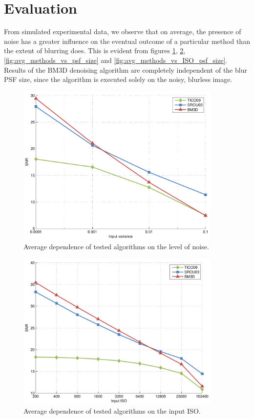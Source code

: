 \documentclass[12pt,notitlepage]{report}
\begin{document}
\clearpage


\section{Evaluation}
\label{sec:evaluation}

From simulated experimental data, we observe that on average, the presence of noise has a greater influence on the eventual outcome of a particular method than the extent of blurring does. This is evident from figures \ref{fig:avg_methods_vs_var}, \ref{fig:avg_methods_vs_ISO}, \ref{fig:avg_methods_vs_psf_size} and \ref{fig:avg_methods_vs_ISO_psf_size}. Results of the BM3D denoising algorithm are completely independent of the blur PSF size, since the algorithm is executed solely on the noisy, blurless image.

\begin{figure}[htb]
 \centering
  \includegraphics[width=0.9\textwidth]{avg_methods_vs_var.pdf}
 \caption{Average dependence of tested algorithms on the level of noise.}
 \label{fig:avg_methods_vs_var}
\end{figure}

\begin{figure}[htb]
 \centering
  \includegraphics[width=0.9\textwidth]{avg_methods_vs_ISO.pdf}
 \caption{Average dependence of tested algorithms on the input ISO.}
 \label{fig:avg_methods_vs_ISO}
\end{figure}
\end{document}
